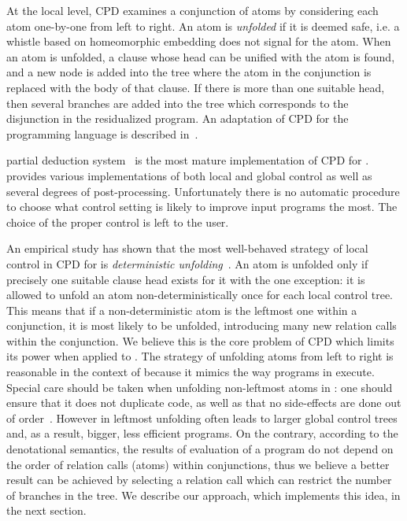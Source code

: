 At the local level, CPD examines a conjunction of atoms by considering each atom one-by-one from left to right.
An atom is \emph{unfolded} if it is deemed safe, i.e. a whistle based on homeomorphic embedding does not signal for the atom.
When an atom is unfolded, a clause whose head can be unified with the atom is found, and a new node is added into the tree where the atom in the conjunction is replaced with the body of that clause.
If there is more than one suitable head, then several branches are added into the tree which corresponds to the disjunction in the residualized program.
An adaptation of CPD for the \mk programming language is described in~\cite{lozov2019relational}.

\ecce partial deduction system~\cite{leuschel1997ecce, LeuschelEVCF06} is the most mature implementation of CPD for \pro.
\ecce provides various implementations of both local and global control as well as several degrees of post-processing.
Unfortunately there is no automatic procedure to choose what control setting is likely to improve input programs the most.
The choice of the proper control is left to the user.

An empirical study has shown that the most well-behaved strategy of local control in CPD for \pro is \emph{deterministic unfolding}~\cite{leuschel1997advanced}.
An atom is unfolded only if precisely one suitable clause head exists for it with the one exception: it is allowed to unfold an atom non-deterministically once for each local control tree.
This means that if a non-deterministic atom is the leftmost one within a conjunction, it is most likely to be unfolded, introducing many new relation calls within the conjunction.
We believe this is the core problem of CPD which limits its power when applied to \mk.
The strategy of unfolding atoms from left to right is reasonable in the context of \pro because it mimics the way programs in \pro execute.
Special care should be taken when unfolding non-leftmost atoms in \pro: one should ensure that it does not duplicate code, as well as that no side-effects are done out of order~\cite{nonleftmost, leuschel2014fast}.
However in \mk leftmost unfolding often leads to larger global control trees and, as a result, bigger, less efficient programs.
On the contrary, according to the denotational semantics, the results of evaluation of a \mk program do not depend on the order of relation calls (atoms) within conjunctions, thus we believe a better result can be achieved by selecting a relation call which can restrict the number of branches in the tree.
We describe our approach, which implements this idea, in the next section.
